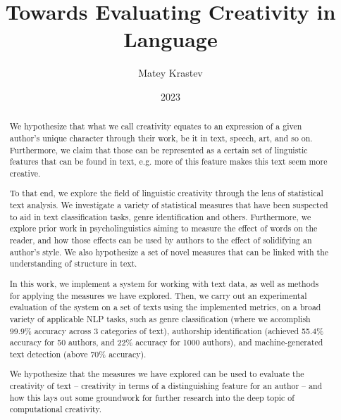 \documentclass[bsc]{abdnthesis}
\title{Towards Evaluating Creativity in Language}
\author{Matey Krastev}
\date{2023}
\begin{document}
 

\maketitle
\makedeclaration

\begin{abstract}

    We hypothesize that what we call creativity equates to an expression of a given author's unique character through their work, be it in text, speech, art, and so on. Furthermore, we claim that those can be represented as a certain set of linguistic features that can be found in text, e.g. more of this feature makes this text seem more creative.

    To that end, we explore the field of linguistic creativity through the lens of statistical text analysis. We investigate a variety of statistical measures that have been suspected to aid in text classification tasks, genre identification and others. Furthermore, we explore prior work in psycholinguistics aiming to measure the effect of words on the reader, and how those effects can be used by authors to the effect of solidifying an author's style. We also hypothesize a set of novel measures that can be linked with the understanding of structure in text. 
    
    In this work, we implement a system for working with text data, as well as methods for applying the measures we have explored. Then, we carry out an experimental evaluation of the system on a set of texts using the implemented metrics, on a broad variety of applicable NLP tasks, such as genre classification (where we accomplish 99.9\% accuracy across 3 categories of text), authorship identification (achieved 55.4\% accuracy for 50 authors, and 22\% accuracy for 1000 authors), and machine-generated text detection (above 70\% accuracy). 
    
    We hypothesize that the measures we have explored can be used to evaluate the creativity of text -- creativity in terms of a distinguishing feature for an author -- and how this lays out some groundwork for further research into the deep topic of computational creativity.
\end{abstract}
\end{document}
